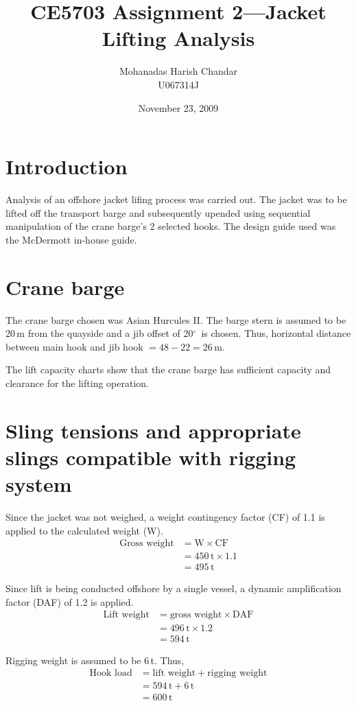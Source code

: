\documentclass[a4paper,10pt]{article}
\title{CE5703 Assignment 2---Jacket Lifting Analysis}
\author{Mohanadas Harish Chandar \\
        U067314J}
\date{November 23, 2009}
\renewcommand{\deg}{$^\circ$}
\begin{document}
\maketitle

\section*{Introduction}
Analysis of an offshore jacket lifing process was carried out. 
The jacket was to be lifted off the transport barge and subsequently upended 
using sequential manipulation of the crane barge's 2 selected hooks.
The design guide used was the McDermott in-house guide.

\section*{Crane barge}
The crane barge chosen was Asian Hurcules II. 
The barge stern is assumed to be 20\,m from the quayside and a 
jib offset of 20\deg\ is chosen. 
Thus, horizontal distance between main hook and jib hook 
$= 48 - 22 = 26\,\mathrm{m}$.

The lift capacity charts show that the crane barge has sufficient capacity 
and clearance for the lifting operation. 

\section{Sling tensions and appropriate slings compatible with rigging system}
Since the jacket was not weighed, a weight contingency factor (CF) of 1.1 is 
applied to the calculated weight (W).
\begin{align*}
\text{Gross weight} &= \mathrm{W} \times \mathrm{CF} \\
                    &= 450\,\mathrm{t} \times 1.1 \\
                    &= 495\,\mathrm{t}
\end{align*}

Since lift is being conducted offshore by a single vessel, a dynamic 
amplification factor (DAF) of 1.2 is applied.
\begin{align*}
\text{Lift weight} &= \text{gross weight} \times \mathrm{DAF} \\
                   &= 496\,\mathrm{t} \times 1.2 \\
                   &= 594\,\mathrm{t}
\end{align*}

Rigging weight is assumed to be 6\,t. Thus,
\begin{align*}
\text{Hook load} &= \text{lift weight} + \text{rigging weight} \\
                 &= 594\,\mathrm{t} + 6\,\mathrm{t} \\
                 &= 600\,\mathrm{t}
\end{align*}
\end{document}
